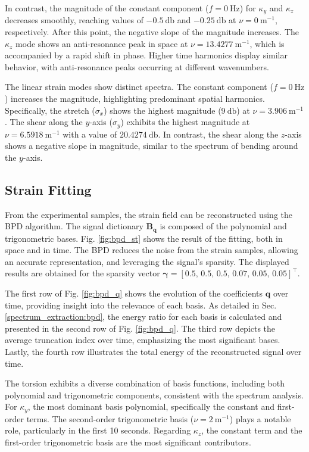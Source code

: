 In contrast, the magnitude of the constant component ($f = \SI{0}{\hertz}$) for $\kappa_y$ and $\kappa_z$ decreases smoothly, reaching values of $\SI{-0.5}{\decibel}$ and $\SI{-0.25}{\decibel}$ at $\nu = \SI{0}{\meter^{-1}}$, respectively. After this point, the negative slope of the magnitude increases. The $\kappa_z$ mode shows an anti-resonance peak in space at $\nu = \SI{13.4277}{\meter^{-1}}$, which is accompanied by a rapid shift in phase. Higher time harmonics display similar behavior, with anti-resonance peaks occurring at different wavenumbers.

The linear strain modes show distinct spectra. The constant component (\(f = \SI{0}{\hertz}\)) increases the magnitude, highlighting predominant spatial harmonics. Specifically, the stretch ($\sigma_x$) shows the highest magnitude ($\SI{9}{\decibel}$) at $\nu = \SI{3.906}{\meter^{-1}}$. The shear along the $y$-axis ($\sigma_y$) exhibits the highest magnitude at $\nu = \SI{6.5918}{\meter^{-1}}$ with a value of $\SI{20.4274}{\decibel}$. In contrast, the shear along the $z$-axis shows a negative slope in magnitude, similar to the spectrum of bending around the $y$-axis.


\subsection{Strain Fitting}
 From the experimental samples, the strain field can be reconstructed using the \ac{BPD} algorithm. The signal dictionary $\bm{B}_{\bm{q}}$ is composed of the polynomial and trigonometric bases.
 Fig. \ref{fig:bpd_st} shows the result of the fitting, both in space and in time. The \ac{BPD} reduces the noise from the strain samples, allowing an accurate representation, and leveraging the signal's sparsity. 
 The displayed results are obtained for the sparsity vector $\bm{\gamma} = [0.5, \,  0.5, \,  0.5, \, 0.07, \,  0.05, \,  0.05]^{\top}$.

The first row of Fig. \ref{fig:bpd_q} shows the evolution of the coefficients $\bm{q}$ over time, providing insight into the relevance of each basis. As detailed in Sec. \ref{spectrum_extraction:bpd}, the energy ratio for each basis is calculated and presented in the second row of Fig. \ref{fig:bpd_q}. The third row depicts the average truncation index over time, emphasizing the most significant bases. Lastly, the fourth row illustrates the total energy of the reconstructed signal over time.

The torsion exhibits a diverse combination of basis functions, including both polynomial and trigonometric components, consistent with the spectrum analysis.
For $\kappa_y$, the most dominant basis polynomial, specifically the constant and first-order terms. The second-order trigonometric basis ($\nu = \SI{2}{\meter^{-1}}$) plays a notable role, particularly in the first 10 seconds.
Regarding $\kappa_z$, the constant term and the first-order trigonometric basis are the most significant contributors.


